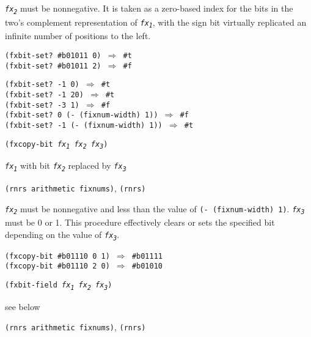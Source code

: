 \texttt{\textit{fx\textsubscript{2}}} must be nonnegative.
It is taken as a zero-based index for the bits
in the two's complement representation of \texttt{\textit{fx\textsubscript{1}}}, with the sign
bit virtually replicated an infinite number of positions to the left.

\begin{alltt}
(fxbit-set? \#{}b01011 0) \(\Rightarrow\) \#{}t
(fxbit-set? \#{}b01011 2) \(\Rightarrow\) \#{}f

(fxbit-set? -1 0) \(\Rightarrow\) \#{}t
(fxbit-set? -1 20) \(\Rightarrow\) \#{}t
(fxbit-set? -3 1) \(\Rightarrow\) \#{}f
(fxbit-set? 0 (- (fixnum-width) 1)) \(\Rightarrow\) \#{}f
(fxbit-set? -1 (- (fixnum-width) 1)) \(\Rightarrow\) \#{}t
\end{alltt}

\begin{description}

\label{objects_s169}\item[procedure] \texttt{(fxcopy-bit \textit{fx\textsubscript{1}} \textit{fx\textsubscript{2}} \textit{fx\textsubscript{3}})}



\item[returns] \texttt{\textit{fx\textsubscript{1}}} with bit \texttt{\textit{fx\textsubscript{2}}} replaced by \texttt{\textit{fx\textsubscript{3}}}


\item[libraries] \texttt{(rnrs arithmetic fixnums)}, \texttt{(rnrs)}
\end{description}

\texttt{\textit{fx\textsubscript{2}}} must be nonnegative and less than the value of
\texttt{(- (fixnum-width) 1)}.
\texttt{\textit{fx\textsubscript{3}}} must be 0 or 1.
This procedure effectively clears or sets the specified bit depending
on the value of \texttt{\textit{fx\textsubscript{3}}}.

\begin{alltt}
(fxcopy-bit \#{}b01110 0 1) \(\Rightarrow\) \#{}b01111
(fxcopy-bit \#{}b01110 2 0) \(\Rightarrow\) \#{}b01010
\end{alltt}

\begin{description}

\label{objects_s170}\item[procedure] \texttt{(fxbit-field \textit{fx\textsubscript{1}} \textit{fx\textsubscript{2}} \textit{fx\textsubscript{3}})}



\item[returns] see below


\item[libraries] \texttt{(rnrs arithmetic fixnums)}, \texttt{(rnrs)}
\end{description}


